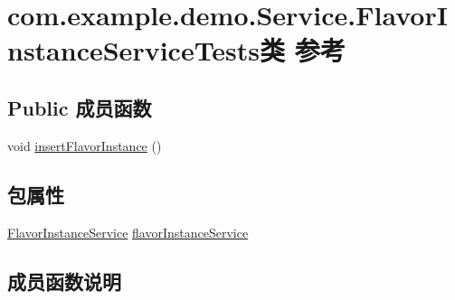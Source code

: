 \hypertarget{classcom_1_1example_1_1demo_1_1_service_1_1_flavor_instance_service_tests}{}\section{com.\+example.\+demo.\+Service.\+Flavor\+Instance\+Service\+Tests类 参考}
\label{classcom_1_1example_1_1demo_1_1_service_1_1_flavor_instance_service_tests}
\subsection*{Public 成员函数}
\begin{DoxyCompactItemize}
\item 
void \mbox{\hyperlink{classcom_1_1example_1_1demo_1_1_service_1_1_flavor_instance_service_tests_a6c45e3aff773214bee4a9cb1032acc56}{insert\+Flavor\+Instance}} ()
\end{DoxyCompactItemize}
\subsection*{包属性}
\begin{DoxyCompactItemize}
\item 
\mbox{\hyperlink{classcom_1_1example_1_1demo_1_1service_1_1_flavor_instance_service}{Flavor\+Instance\+Service}} \mbox{\hyperlink{classcom_1_1example_1_1demo_1_1_service_1_1_flavor_instance_service_tests_a6fb1dbd7053edbedcd63164466341980}{flavor\+Instance\+Service}}
\end{DoxyCompactItemize}


\subsection{成员函数说明}
\mbox{\label{classcom_1_1example_1_1demo_1_1_service_1_1_flavor_instance_service_tests_a6c45e3aff773214bee4a9cb1032acc56}} 
